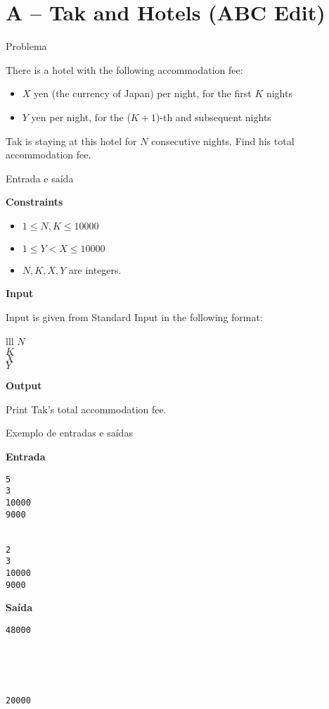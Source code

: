 \section{A -- Tak and Hotels (ABC Edit)}

\begin{frame}[fragile]{Problema}

There is a hotel with the following accommodation fee:

\begin{itemize}
    \item $X$ yen (the currency of Japan) per night, for the first $K$ nights
    \item $Y$ yen per night, for the ($K + 1$)-th and subsequent nights
\end{itemize}

Tak is staying at this hotel for $N$ consecutive nights. Find his total accommodation fee.

\end{frame}

\begin{frame}[fragile]{Entrada e saída}

\textbf{Constraints}

\begin{itemize}
    \item $1 \leq N, K\leq 10000$
    \item $1 \leq Y < X \leq 10000$
    \item $N, K, X, Y$ are integers.
\end{itemize}

\textbf{Input}

Input is given from Standard Input in the following format:
\begin{atcoderio}{lll}
$N$ \\
$K$ \\
$X$ \\
$Y$
\end{atcoderio}

\textbf{Output}

Print Tak's total accommodation fee.

\end{frame}

\begin{frame}[fragile]{Exemplo de entradas e saídas}

\begin{minipage}[t]{0.45\textwidth}
\textbf{Entrada}
\begin{verbatim}
5
3
10000
9000


2
3
10000
9000
\end{verbatim}
\end{minipage}
\begin{minipage}[t]{0.5\textwidth}
\textbf{Saída}
\begin{verbatim}
48000





20000
\end{verbatim}
\end{minipage}
\end{frame}

